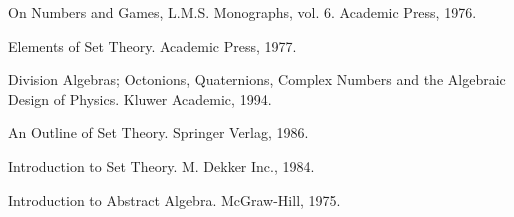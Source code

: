 \Ref

     {On Numbers and Games, L.M.S. Monographs, vol. 6.}
     {Academic Press, 1976.}

     {Elements of Set Theory.}
     {Academic Press, 1977.}

     {Division Algebras; Octonions, Quaternions, Complex Numbers and the
     Algebraic Design of Physics.}
     {Kluwer Academic, 1994.}

     {An Outline of Set Theory.}
     {Springer Verlag, 1986.}

     {Introduction to Set Theory.}
     {M. Dekker Inc., 1984.}

     {Introduction to Abstract Algebra.}
     {McGraw-Hill, 1975.}
